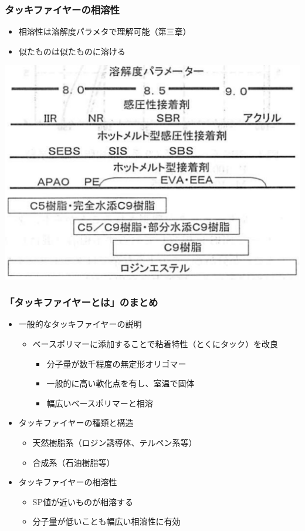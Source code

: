 \documentclass[12pt, dvipdfmx]{beamer}
\begin{document}
\begin{frame}
	\frametitle{タッキファイヤーの相溶性}
		\begin{itemize}
			\item 相溶性は溶解度パラメタで理解可能（第三章）
			\item 似たものは似たものに溶ける
		\end{itemize}

			\vspace{3mm}
			\centering
				\includegraphics[width=.6\textwidth]{souyousei.png}
\end{frame}

\begin{frame}
	\frametitle{「タッキファイヤーとは」のまとめ}
        \begin{boxnote}
            \vspace{-3mm}
            \begin{itemize}
                \item 一般的なタッキファイヤーの説明
                    \begin{itemize}
                        \item ベースポリマーに添加することで粘着特性（とくにタック）を改良
                        \begin{itemize}
							\item \alert{分子量が数千程度}の無定形オリゴマー
							\item 一般的に\alert{高い軟化点}を有し、室温で固体
							\item 幅広いベースポリマーと\alert{相溶}
						\end{itemize}
                    \end{itemize} 
                \item タッキファイヤーの種類と構造
                    \begin{itemize}
                        \item 天然樹脂系（ロジン誘導体、テルペン系等）
                        \item 合成系（石油樹脂等）
                    \end{itemize} 
                \item タッキファイヤーの相溶性
                    \begin{itemize}
                        \item SP値が近いものが相溶する
						\item 分子量が低いことも幅広い相溶性に有効
                    \end{itemize}
            \end{itemize}
        \end{boxnote}
\end{frame}
\end{document}
